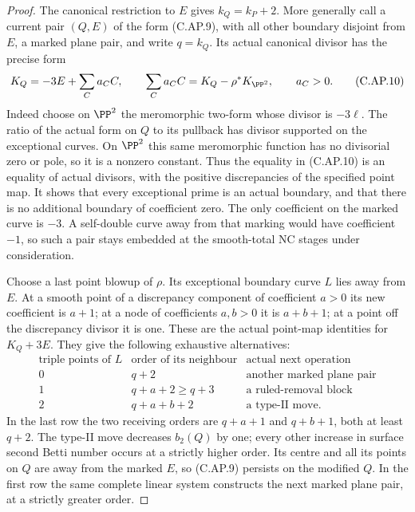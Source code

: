 \begin{proof}
The canonical restriction to \(E\) gives
\(k_Q=k_P+2\). More generally call a current pair \((Q,E)\)
of the form (C.AP.9), with all other boundary disjoint from
\(E\), a marked plane pair, and write \(q=k_Q\). Its actual
canonical divisor has the precise form
\[
 K_Q=-3E+\sum_C a_CC,
 \qquad \sum_C a_CC=K_Q-\rho^*K_{\PP^2},
 \qquad a_C>0.
 \tag{C.AP.10}
\]
Indeed choose on \(\PP^2\) the meromorphic two-form whose
divisor is \(-3\ell\). The ratio of the actual form on \(Q\)
to its pullback has divisor supported on the exceptional
curves. On \(\PP^2\) this same meromorphic function has no
divisorial zero or pole, so it is a nonzero constant. Thus
the equality in (C.AP.10) is an equality of actual divisors,
with the positive discrepancies of the specified point map.
It shows that every exceptional prime is an actual
boundary, and that there is no additional boundary of
coefficient zero. The only coefficient on the marked curve
is \(-3\). A self-double curve away from that marking would
have coefficient \(-1\), so such a pair stays embedded at
the smooth-total NC stages under consideration.

Choose a last point blowup of \(\rho\). Its exceptional
boundary curve \(L\) lies away from \(E\). At a smooth point
of a discrepancy component of coefficient \(a>0\) its new
coefficient is \(a+1\); at a node of coefficients \(a,b>0\)
it is \(a+b+1\); at a point off the discrepancy divisor it
is one. These are the actual point-map identities for
\(K_Q+3E\). They give the following exhaustive alternatives:
\[
\begin{array}{c|c|c}
 \text{triple points of }L&\text{order of its neighbour}
                       &\text{actual next operation}\\ \hline
 0&q+2&\text{another marked plane pair}\\
 1&q+a+2\ge q+3&\text{a ruled-removal block}\\
 2&q+a+b+2&\text{a type-II move}.
\end{array}
 \tag{C.AP.11}
\]
In the last row the two receiving orders are
\(q+a+1\) and \(q+b+1\), both at least \(q+2\). The type-II
move decreases \(b_2(Q)\) by one; every other increase in
surface second Betti number occurs at a strictly higher
order. Its centre and all its points on \(Q\) are away from
the marked \(E\), so (C.AP.9) persists on the modified \(Q\).
In the first row the same complete linear system constructs
the next marked plane pair, at a strictly greater order.


\end{proof}
